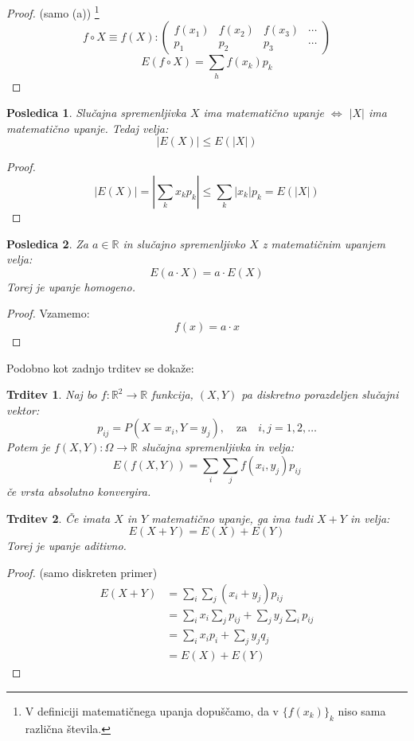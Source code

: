 \documentclass[12pt]{book}
\def\n{\noindent}
\theoremstyle{definition}
\theoremstyle{plain}
\theoremstyle{plain}
\newtheorem{trditev}{Trditev}
\theoremstyle{plain}
\newtheorem{posledica}{Posledica}
\theoremstyle{remark}
\begin{document}
\begin{proof}(samo (a)) \footnote[2]{V definiciji matematičnega upanja dopuščamo, da v $\{ f(x_k)\}_k$ niso sama različna števila.}
    $$
    f \circ X \equiv f(X):\left(\begin{array}{cccc}
        f\left(x_1\right) & f\left(x_2\right) & f\left(x_3\right) & \cdots \\
        p_1 & p_2 & p_3 & \cdots
        \end{array}\right)
    $$
    $$
    E(f \circ X)=\sum_h f\left(x_k\right) p_k
    $$
\end{proof}

\begin{posledica}
    Slučajna spremenljivka $X$ ima matematično upanje $\iff$ $|X|$ ima matematično upanje. Tedaj velja: 
    $$
    |E(X)| \leq E(|X|)
    $$
\end{posledica}
    
\begin{proof}
    $$
    |E(X)|=\left|\sum_k x_k  p_k \right| \leq \sum_k\left|x_k\right| p_k = E(|X|)
    $$
\end{proof}

\begin{posledica}
    Za $a \in \mathbb{R}$ in slučajno spremenljivko $X$ z matematičnim upanjem velja: 
    $$
    E(a \cdot X)=a \cdot E(X)
    $$
    Torej je upanje homogeno.
\end{posledica}

\begin{proof}
    Vzamemo: 
    $$
    f(x)=a \cdot x
    $$
\end{proof}

\n Podobno kot zadnjo trditev se dokaže:
\begin{trditev}
    Naj bo $f: \mathbb{R}^2 \to \mathbb{R}$ funkcija, $(X,Y)$ pa diskretno porazdeljen slučajni vektor: 
    $$
    p_{i j}=P\left(X=x_i, Y=y_j\right), \quad \text{za} \quad i, j=1,2, \ldots
    $$
    Potem je $f(X, Y): \Omega \to \mathbb{R}$ slučajna spremenljivka in velja: 
    $$
    E(f(X, Y))=\sum_i \sum_j f\left(x_i, y_j\right)  p_{i j}
    $$
    če vrsta absolutno konvergira.
\end{trditev}

\begin{trditev}
    Če imata $X$ in $Y$ matematično upanje, ga ima tudi $X+Y$ in velja: 
    $$
    E(X+Y)=E(X)+E(Y)
    $$
    Torej je upanje aditivno. 
\end{trditev}

\begin{proof}(samo diskreten primer)
    $$
    \begin{aligned}
        E(X+Y)&=\sum_i \sum_j\left(x_i+y_j\right) p_{i j} \\
        &=\sum_i x_i \sum_j p_{i j}+\sum_j y_j \sum_i p_{i j} \\
        &=\sum_i x_i p_i+\sum_j y_j q_j \\
        &=E(X) + E(Y)
    \end{aligned}
    $$
\end{proof}
\end{document}
